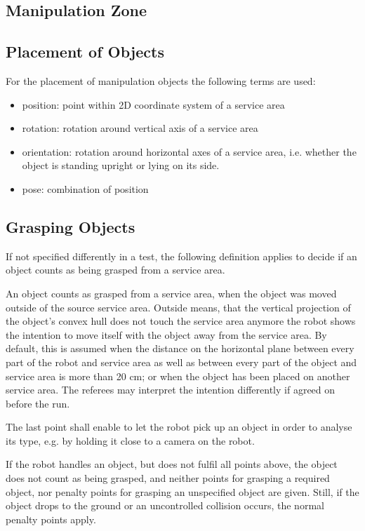 \subsection{Manipulation Zone}

\subsection{Placement of Objects}
For the placement of manipulation objects the following terms are used:

\begin{itemize}
\item position: point within 2D coordinate system of a service area
\item rotation: rotation around vertical axis of a service area
\item orientation: rotation around horizontal axes of a service area, i.e. whether the object is standing upright or lying on its side.
\item pose: combination of position
\end{itemize}

\subsection{Grasping Objects} \label{ssec:GraspingObjects}
If not specified differently in a test, the following definition applies to decide if an object counts as being grasped from a service area.
\par
An object counts as grasped from a service area, when
the object was moved outside of the source service area. Outside means, that the vertical projection of the object’s convex hull does not touch the service area anymore
the robot shows the intention to move itself with the object away from the service area. By default, this is assumed when the distance on the horizontal plane between every part of the robot and service area as well as between every part of the object and service area is more than 20 cm; or when the object has been placed on another service area. The referees may interpret the intention differently if agreed on before the run.
\par
The last point shall enable to let the robot pick up an object in order to analyse its type, e.g. by holding it close to a camera on the robot.
\par
If the robot handles an object, but does not fulfil all points above, the object does not count as being grasped, and neither points for grasping a required object, nor penalty points for grasping an unspecified object are given. Still, if the object drops to the ground or an uncontrolled collision occurs, the normal penalty points apply.

